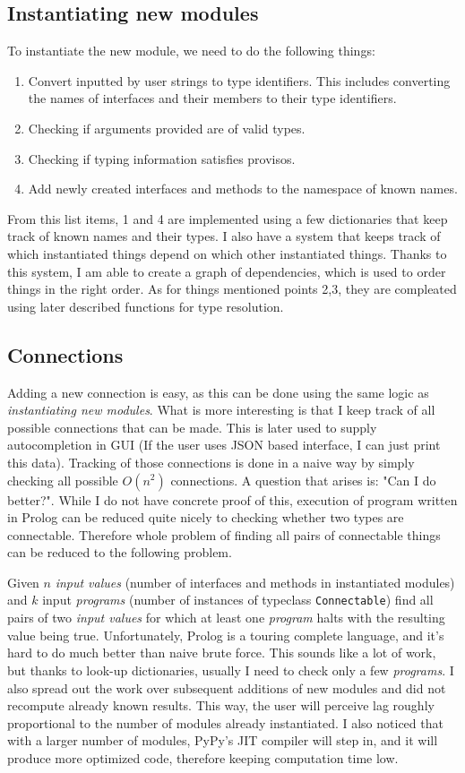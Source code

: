 \documentclass[12pt]{report}
\begin{document}
\subsection{Instantiating new modules} 
To instantiate the new module, we need to do the following things: 
\begin{enumerate} 
   \item Convert inputted by user strings to type identifiers. This includes converting the names of interfaces and their members to their type identifiers. 
   \item Checking if arguments provided are of valid types. 
   \item Checking if typing information satisfies provisos. 
   \item Add newly created interfaces and methods to the namespace of known names. 
\end{enumerate} 
From this list items, 1 and 4 are implemented using a few dictionaries that keep track of known names and their types. I also have a system that keeps track of which instantiated things depend on which other instantiated things. Thanks to this system, I am able to create a graph of dependencies, which is used to order things in the right order. As for things mentioned points 2,3, they are compleated using later described functions for type resolution. 
\subsection{Connections}
Adding a new connection is easy, as this can be done using the same logic as \emph{instantiating new modules}. What is more interesting is that I keep track of all possible connections that can be made. This is later used to supply autocompletion in GUI (If the user uses JSON based interface, I can just print this data). Tracking of those connections is done in a naive way by simply checking all possible $O(n^2)$ connections. A question that arises is: "Can I do better?". While I do not have concrete proof of this, execution of program written in Prolog can be reduced quite nicely to checking whether two types are connectable. Therefore whole problem of finding all pairs of connectable things can be reduced to the following problem.
\par
Given $n$ \emph{input values} (number of interfaces and methods in instantiated modules) and $k$ input \emph{programs} (number of instances of typeclass \verb!Connectable!) find all pairs of two \emph{input values} for which at least one \emph{program} halts with the resulting value being true.
Unfortunately, Prolog is a touring complete language, and it's hard to do much better than naive brute force.
This sounds like a lot of work, but thanks to look-up dictionaries, usually I need to check only a few \emph{programs}. I also spread out the work over subsequent additions of new modules and did not recompute already known results. This way, the user will perceive lag roughly proportional to the number of modules already instantiated. I also noticed that with a larger number of modules, PyPy's JIT compiler will step in, and it will produce more optimized code, therefore keeping computation time low. 
 
\end{document}
